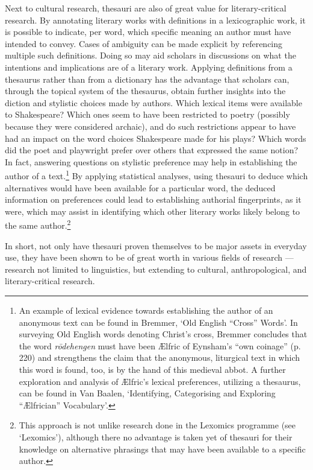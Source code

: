 Next to cultural research, thesauri are also of great value for literary-critical research. By annotating literary works with definitions in a lexicographic work, it is possible to indicate, per word, which specific meaning an author must have intended to convey. Cases of ambiguity can be made explicit by referencing multiple such definitions. Doing so may aid scholars in discussions on what the intentions and implications are of a literary work. Applying definitions from a thesaurus rather than from a dictionary has the advantage that scholars can, through the topical system of the thesaurus, obtain further insights into the diction and stylistic choices made by authors. Which lexical items were available to Shakespeare? Which ones seem to have been restricted to poetry (possibly because they were considered archaic), and do such restrictions appear to have had an impact on the word choices Shakespeare made for his plays? Which words did the poet and playwright prefer over others that expressed the same notion? In fact, answering questions on stylistic preference may help in establishing the author of a text.\footnote{An example of lexical evidence towards establishing the author of an anonymous text can be found in Bremmer, `Old English ``Cross'' Words'. In surveying Old English words denoting Christ's cross, Bremmer concludes that the word \textit{rōdehengen} must have been Ælfric of Eynsham's ``own coinage'' (p. 220) and strengthens the claim that the anonymous, liturgical text in which this word is found, too, is by the hand of this medieval abbot. A further exploration and analysis of Ælfric's lexical preferences, utilizing a thesaurus, can be found in Van Baalen, `Identifying, Categorising and Exploring ``Ælfrician'' Vocabulary'.} By applying statistical analyses, using thesauri to deduce which alternatives would have been available for a particular word, the deduced information on preferences could lead to establishing authorial fingerprints, as it were, which may assist in identifying which other literary works likely belong to the same author.\footnote{This approach is not unlike research done in the Lexomics programme (see `Lexomics'), although there no advantage is taken yet of thesauri for their knowledge on alternative phrasings that may have been available to a specific author.} 

In short, not only have thesauri proven themselves to be major assets in everyday use, they have been shown to be of great worth in various fields of research --- research not limited to linguistics, but extending to cultural, anthropological, and literary-critical research.


